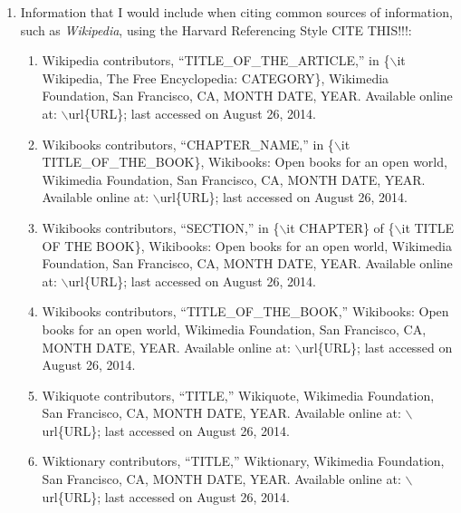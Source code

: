 \documentclass[letter,12pt]{article}
\begin{document}
\begin{enumerate}
	\begin{enumerate} \itemsep -2pt
	\item Include all {\sc Bib}\TeX\ keys in one citation in your \LaTeX\ document.
	\item Typeset the \LaTeX\ document.
	\item Check that the font and style of the reference list is correct.
	\item If there are errors, correct the errors as appropriate.
	\item Finally, the {\sc Bib}\TeX\ database should be correct.
	\end{enumerate}
\item Information that I would include when citing common sources of information, such as {\it Wikipedia}, using the Harvard Referencing Style {\Huge CITE THIS!!!}: \vspace{-0.3cm}
	\begin{enumerate} \itemsep -2pt
	\item Wikipedia contributors, ``TITLE\_OF\_THE\_ARTICLE,'' in \{$\backslash$it Wikipedia, The Free Encyclopedia: CATEGORY\}, Wikimedia Foundation, San Francisco, CA, MONTH DATE, YEAR. Available online at: $\backslash$url\{URL\}; last accessed on August 26, 2014.
	\item Wikibooks contributors, ``CHAPTER\_NAME,'' in \{$\backslash$it TITLE\_OF\_THE\_BOOK\}, Wikibooks: Open books for an open world, Wikimedia Foundation, San Francisco, CA, MONTH DATE, YEAR. Available online at: $\backslash$url\{URL\}; last accessed on August 26, 2014.
	\item Wikibooks contributors, ``SECTION,'' in \{$\backslash$it CHAPTER\} of \{$\backslash$it TITLE OF THE BOOK\}, Wikibooks: Open books for an open world, Wikimedia Foundation, San Francisco, CA, MONTH DATE, YEAR. Available online at: $\backslash$url\{URL\}; last accessed on August 26, 2014.
	\item Wikibooks contributors, ``TITLE\_OF\_THE\_BOOK,'' Wikibooks: Open books for an open world, Wikimedia Foundation, San Francisco, CA, MONTH DATE, YEAR. Available online at: $\backslash$url\{URL\}; last accessed on August 26, 2014.
	\item Wikiquote contributors, ``TITLE,'' Wikiquote, Wikimedia Foundation, San Francisco, CA, MONTH DATE, YEAR. Available online at: $\backslash$url\{URL\}; last accessed on August 26, 2014.
	\item Wiktionary contributors, ``TITLE,'' Wiktionary, Wikimedia Foundation, San Francisco, CA, MONTH DATE, YEAR. Available online at: $\backslash$url\{URL\}; last accessed on August 26, 2014.

\end{enumerate}
\end{enumerate}
\end{document}
